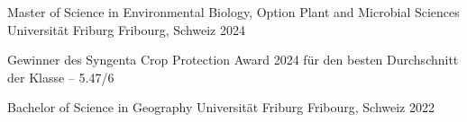 

\begin{cventries}

  \cventry
    {Master of Science in Environmental Biology, Option Plant and Microbial Sciences} %
    {Universität Friburg} %
    {Fribourg, Schweiz} %
    {2024} %
    {
      \begin{cvitems} %
        \item {Gewinner des Syngenta Crop Protection Award 2024 für den besten Durchschnitt der Klasse -- 5.47/6}
      \end{cvitems}
    }

  \cventry
    {Bachelor of Science in Geography} %
    {Universität Friburg} %
    {Fribourg, Schweiz} %
    {2022} %
    {}

\end{cventries}
